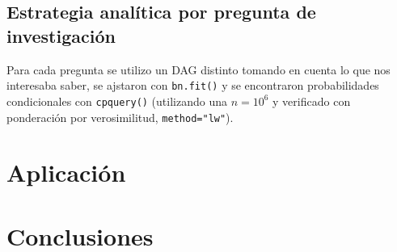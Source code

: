 \documentclass[
  letterpaper,
  DIV=11,
  numbers=noendperiod]{scrartcl}
\begin{document}
\subsection{Estrategia analítica por pregunta de investigación}
Para cada pregunta se utilizo un DAG distinto tomando en cuenta lo que nos interesaba saber, se ajstaron con \texttt{bn.fit()} y se encontraron probabilidades condicionales con \texttt{cpquery()} (utilizando una \(n=10^{6}\) y verificado con ponderación por
verosimilitud, \texttt{method="lw"}).

\section{Aplicación}\label{Aplicación}

\section{Conclusiones}\label{Conclusiones}


\end{document}
